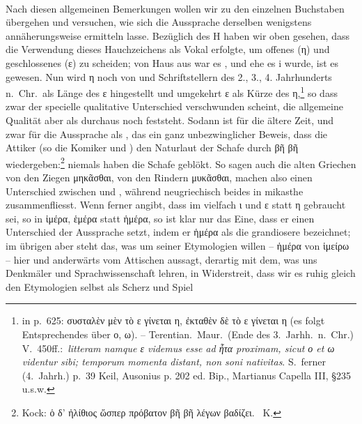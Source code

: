 \paragraph{} Nach diesen allgemeinen Bemerkungen wollen wir zu den einzelnen
Buchstaben
übergehen und versuchen, wie sich die Aussprache derselben wenigstens
annäherungsweise ermitteln lasse. Bezüglich des H haben wir oben gesehen, dass
die Verwendung dieses Hauchzeichens als Vokal erfolgte, um offenes (η) und
geschlossenes (ε)  zu scheiden; von Haus aus war es , und ehe es i wurde, ist
es  gewesen. Nun wird η noch von  und  Schriftstellern
des 2., 3., 4. Jahrhunderts n.~Chr.~als Länge des ε hingestellt und umgekehrt ε
als Kürze des η,\footnote{ in  p.\ 625: συσταλὲν μὲν τὸ ε
	γίνεται η, ἐκταθὲν δὲ τὸ ε γίνεται η (es folgt Entsprechendes über ο, ω). --
	Terentian.\ Maur.\ (Ende des 3.\ Jarhh.\ n.~Chr.) V\@.~450ff.:\ \emph{litteram namque ε
		videmus esse ad ἦτα proximam, sicut ο et ω videntur sibi; temporum momenta
		distant, non soni nativitas}. S.\ ferner  (4.\
	Jahrh.) 
	p.\ 39 Keil, Ausonius p. 202 ed. Bip., Martianus Capella III, §235
	u.s.w.} so dass zwar der specielle qualitative Unterschied
verschwunden scheint, die allgemeine Qualität aber als  durchaus noch
feststeht.
Sodann ist für die ältere Zeit, und zwar für die Aussprache als ,
das ein ganz unbezwinglicher Beweis, dass die Attiker (so die Komiker
\authorlong{Kratinos}
und ) den Naturlaut der Schafe durch βῆ βῆ
wiedergeben:\footnote{\passagemb{KratinosFr43} Kock: ὁ
	δ' ἠλίθιος ὥσπερ πρόβατον βῆ βῆ λέγων βαδίζει.\  K.} niemals
haben die Schafe \ipa{vi vi} geblökt.
So sagen auch die alten Griechen von den
Ziegen μηκᾶσθαι, von den Rindern μυκᾶσθαι, machen also einen Unterschied zwischen
\ipa{ē} und \ipa{ü}, während neugriechisch beides in mikasthe zusammenfliesst.
Wenn ferner
 angibt, dass im  vielfach ι und ε statt
η gebraucht sei, so in ἱμέρα, ἑμέρα statt ἡμέρα, so ist klar nur das Eine, dass
er einen Unterschied der Aussprache setzt, indem er ἡμέρα als die
grandiosere bezeichnet;  im übrigen aber steht das, was  um seiner
Etymologien willen -- ἡμέρα von ἱμείρω -- hier und anderwärts vom Attischen
aussagt, derartig mit dem, was uns Denkmäler und Sprachwissenschaft lehren, in
Widerstreit, dass wir es ruhig gleich den Etymologien selbst als Scherz und Spiel
